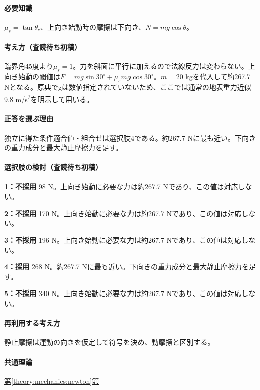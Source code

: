 \paragraph{必要知識} \(\mu_s=\tan\theta_c\)、上向き始動時の摩擦は下向き、\(N=mg\cos\theta\)。

\paragraph{考え方（査読待ち初稿）} 臨界角45度より\(\mu_s=1\)。力を斜面に平行に加えるので法線反力は変わらない。上向き始動の閾値は\(F=mg\sin30^\circ+\mu_smg\cos30^\circ\)。\(m=20\) kgを代入して約267.7 Nとなる。原典でgは数値指定されていないため、ここでは通常の地表重力近似9.8 m/s\textsuperscript{2}を明示して用いる。

\paragraph{正答を選ぶ理由} 独立に得た条件適合値・組合せは選択肢4である。約267.7 Nに最も近い。下向きの重力成分と最大静止摩擦力を足す。

\paragraph{選択肢の検討（査読待ち初稿）}

\noindent\textbf{1：不採用} 98 N。上向き始動に必要な力は約267.7 Nであり、この値は対応しない。\par

\noindent\textbf{2：不採用} 170 N。上向き始動に必要な力は約267.7 Nであり、この値は対応しない。\par

\noindent\textbf{3：不採用} 196 N。上向き始動に必要な力は約267.7 Nであり、この値は対応しない。\par

\noindent\textbf{4：採用} 268 N。約267.7 Nに最も近い。下向きの重力成分と最大静止摩擦力を足す。\par

\noindent\textbf{5：不採用} 340 N。上向き始動に必要な力は約267.7 Nであり、この値は対応しない。\par

\paragraph{再利用する考え方} 静止摩擦は運動の向きを仮定して符号を決め、動摩擦と区別する。

\paragraph{共通理論} \hyperref[theory:mechanics:newton]{第\ref*{theory:mechanics:newton}節}

